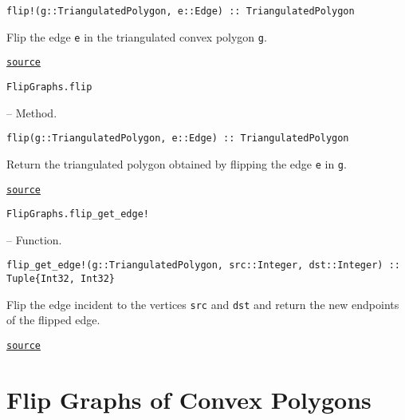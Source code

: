 \begin{adjustwidth}{2em}{0pt}


\begin{verbatim}
flip!(g::TriangulatedPolygon, e::Edge) :: TriangulatedPolygon
\end{verbatim}

Flip the edge \texttt{e} in the triangulated convex polygon \texttt{g}.



\href{https://github.com/schto223/FlipGraphs.jl/blob/490c01a7adf74b42f27dda05099165c47ae8133e/src/polygonTriangulations.jl#L155-L159}{\texttt{source}}


\end{adjustwidth}
\hypertarget{475240096103298242}{\texttt{FlipGraphs.flip}}  -- {Method.}

\begin{adjustwidth}{2em}{0pt}


\begin{verbatim}
flip(g::TriangulatedPolygon, e::Edge) :: TriangulatedPolygon
\end{verbatim}

Return the triangulated polygon obtained by flipping the edge \texttt{e} in \texttt{g}.



\href{https://github.com/schto223/FlipGraphs.jl/blob/490c01a7adf74b42f27dda05099165c47ae8133e/src/polygonTriangulations.jl#L148-L152}{\texttt{source}}


\end{adjustwidth}
\hypertarget{6564352418014428904}{\texttt{FlipGraphs.flip\_get\_edge!}}  -- {Function.}

\begin{adjustwidth}{2em}{0pt}


\begin{verbatim}
flip_get_edge!(g::TriangulatedPolygon, src::Integer, dst::Integer) :: Tuple{Int32, Int32}
\end{verbatim}

Flip the edge incident to the vertices \texttt{src} and \texttt{dst} and return the new endpoints of the flipped edge.



\href{https://github.com/schto223/FlipGraphs.jl/blob/490c01a7adf74b42f27dda05099165c47ae8133e/src/polygonTriangulations.jl#L183-L187}{\texttt{source}}


\end{adjustwidth}

\chapter{Flip Graphs of Convex Polygons}



